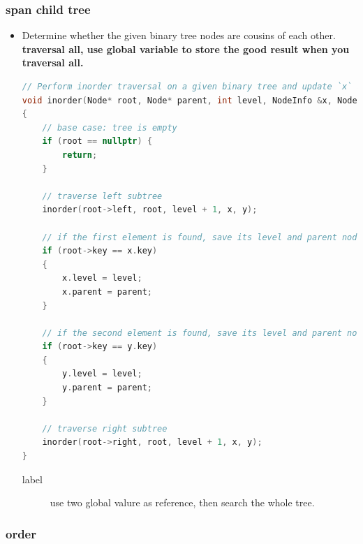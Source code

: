 \documentclass[a4paper,11pt,twoside]{book}
\begin{document}
\subsubsection{span child tree}
\begin{itemize}
	\item Determine whether the given binary tree nodes are cousins of each other. \textbf{traversal all, use global variable to store the good result when you traversal all. } 
\begin{lstlisting}[frame=single, language=c++]
// Perform inorder traversal on a given binary tree and update `x` and `y`
void inorder(Node* root, Node* parent, int level, NodeInfo &x, NodeInfo &y)
{
	// base case: tree is empty
	if (root == nullptr) {
		return;
	}
	
	// traverse left subtree
	inorder(root->left, root, level + 1, x, y);
	
	// if the first element is found, save its level and parent node
	if (root->key == x.key)
	{
		x.level = level;
		x.parent = parent;
	}
	
	// if the second element is found, save its level and parent node
	if (root->key == y.key)
	{
		y.level = level;
		y.parent = parent;
	}
	
	// traverse right subtree
	inorder(root->right, root, level + 1, x, y);
}
\end{lstlisting}
\begin{description}
	\item[label] use two global valure as reference, then search the whole tree. 
\end{description}

\end{itemize}

\subsubsection{order}
\end{document}
